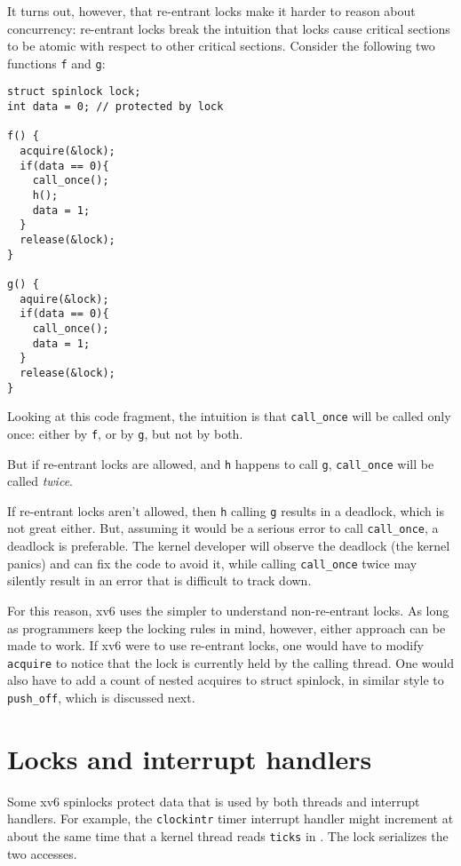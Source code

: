 It turns out, however, that re-entrant locks make it harder to reason
about concurrency: re-entrant locks break the intuition that locks
cause critical sections to be atomic with respect to other critical
sections.  Consider the following two functions \lstinline{f} and
\lstinline{g}:

\begin{lstlisting}
struct spinlock lock;
int data = 0; // protected by lock

f() {
  acquire(&lock);
  if(data == 0){
    call_once();
    h();
    data = 1;
  }
  release(&lock);
}

g() {
  aquire(&lock);
  if(data == 0){
    call_once();
    data = 1;
  }
  release(&lock);
}
\end{lstlisting}

Looking at this code fragment, the intuition is that
\lstinline{call_once} will be called
only once: either by \lstinline{f}, or by \lstinline{g}, but not by
both.

But if re-entrant locks are allowed, and \lstinline{h} happens to call
\lstinline{g}, \lstinline{call_once}
will be called \emph{twice}.

If re-entrant locks aren't allowed, then \lstinline{h} calling
\lstinline{g} results in a deadlock, which is not great either. But,
assuming it would be a serious error to call
\lstinline{call_once}, a deadlock is
preferable.  The kernel developer will observe the deadlock (the
kernel panics) and can fix the code to avoid it, while calling
\lstinline{call_once} twice may
silently result in an error that is difficult to track down.

For this reason, xv6 uses the simpler to understand non-re-entrant
locks.  As long as programmers keep the locking rules in mind,
however, either approach can be made to work. If xv6 were to use
re-entrant locks, one would have to modify \lstinline{acquire} to
notice that the lock is currently held by the calling thread. One
would also have to add a count of nested acquires to struct spinlock,
in similar style to \lstinline{push_off}, which is discussed next.

\section{Locks and interrupt handlers}
\label{s:lockinter}

Some xv6 spinlocks protect data that is used by
both threads and interrupt handlers.
For example, the
\lstinline{clockintr}
timer interrupt handler might increment
at about the same time that a kernel
thread reads
\lstinline{ticks} 
in
.
The lock
serializes the two accesses.

